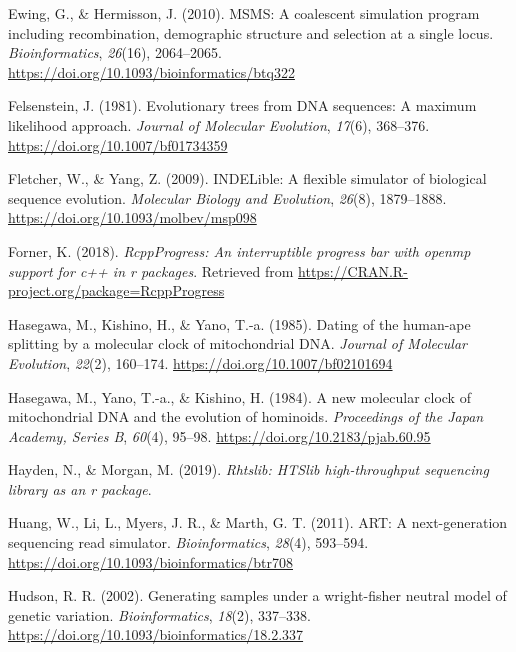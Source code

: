 \documentclass[12pt,]{article}
\begin{document}
\leavevmode\hypertarget{ref-Ewing_2010}{}%
Ewing, G., \& Hermisson, J. (2010). MSMS: A coalescent simulation program including recombination, demographic structure and selection at a single locus. \emph{Bioinformatics}, \emph{26}(16), 2064--2065. \url{https://doi.org/10.1093/bioinformatics/btq322}

\leavevmode\hypertarget{ref-Felsenstein_1981}{}%
Felsenstein, J. (1981). Evolutionary trees from DNA sequences: A maximum likelihood approach. \emph{Journal of Molecular Evolution}, \emph{17}(6), 368--376. \url{https://doi.org/10.1007/bf01734359}

\leavevmode\hypertarget{ref-Fletcher_2009}{}%
Fletcher, W., \& Yang, Z. (2009). INDELible: A flexible simulator of biological sequence evolution. \emph{Molecular Biology and Evolution}, \emph{26}(8), 1879--1888. \url{https://doi.org/10.1093/molbev/msp098}

\leavevmode\hypertarget{ref-Forner_2018}{}%
Forner, K. (2018). \emph{RcppProgress: An interruptible progress bar with openmp support for c++ in r packages}. Retrieved from \url{https://CRAN.R-project.org/package=RcppProgress}

\leavevmode\hypertarget{ref-Hasegawa_1985}{}%
Hasegawa, M., Kishino, H., \& Yano, T.-a. (1985). Dating of the human-ape splitting by a molecular clock of mitochondrial DNA. \emph{Journal of Molecular Evolution}, \emph{22}(2), 160--174. \url{https://doi.org/10.1007/bf02101694}

\leavevmode\hypertarget{ref-Hasegawa_1984}{}%
Hasegawa, M., Yano, T.-a., \& Kishino, H. (1984). A new molecular clock of mitochondrial DNA and the evolution of hominoids. \emph{Proceedings of the Japan Academy, Series B}, \emph{60}(4), 95--98. \url{https://doi.org/10.2183/pjab.60.95}

\leavevmode\hypertarget{ref-Hayden_2019}{}%
Hayden, N., \& Morgan, M. (2019). \emph{Rhtslib: HTSlib high-throughput sequencing library as an r package}.

\leavevmode\hypertarget{ref-Huang_2011}{}%
Huang, W., Li, L., Myers, J. R., \& Marth, G. T. (2011). ART: A next-generation sequencing read simulator. \emph{Bioinformatics}, \emph{28}(4), 593--594. \url{https://doi.org/10.1093/bioinformatics/btr708}

\leavevmode\hypertarget{ref-Hudson_2002}{}%
Hudson, R. R. (2002). Generating samples under a wright-fisher neutral model of genetic variation. \emph{Bioinformatics}, \emph{18}(2), 337--338. \url{https://doi.org/10.1093/bioinformatics/18.2.337}
\end{document}
